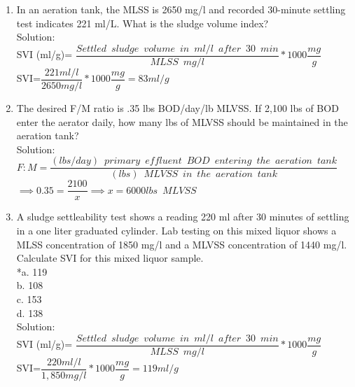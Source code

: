 \begin{enumerate}
\item In an aeration tank, the MLSS is 2650 mg/l and recorded 30-minute settling test indicates 221 ml/L.  What is the sludge volume index?\\
\vspace{0.3cm}
Solution:\\
SVI (ml/g)= $\dfrac{Settled \enspace sludge \enspace volume \enspace in \enspace ml/l \enspace after \enspace 30 \enspace min}{MLSS \enspace mg/l}*1000 \dfrac{mg}{g}$\\
\vspace{0.25cm}
SVI=$\dfrac{221ml/l}{2650mg/l}*1000\dfrac{mg}{g}=\boxed{83ml/g}$
\item The desired F/M ratio is .35 lbs BOD/day/lb MLVSS. If 2,100 lbs of BOD enter the aerator daily, how many lbs of MLVSS should be maintained in the aeration tank?\\
Solution:\\
$F:M=\dfrac{(lbs/day) \enspace primary \enspace effluent  \enspace BOD \enspace entering \enspace the  \enspace aeration \enspace tank}{(lbs) \enspace MLVSS \enspace in \enspace the  \enspace aeration \enspace tank}$\\
\vspace{0.3cm}
$\implies 0.35=\dfrac{2100}{x}\implies x = \boxed{6000lbs \enspace MLVSS}$\\

\item A sludge settleability test shows a reading 220 ml after 30 minutes of settling in a one liter graduated cylinder. Lab testing on this mixed liquor shows a MLSS concentration of 1850 mg/l and a MLVSS concentration of 1440 mg/l. Calculate SVI for this mixed liquor sample.\\

\vspace{0.25cm}
*a. 119 \\
b. 108 \\
c. 153 \\
d. 138 \\

\vspace{0.25cm}
Solution:\\
SVI (ml/g)= $\dfrac{Settled \enspace sludge \enspace volume \enspace in \enspace ml/l \enspace after \enspace 30 \enspace min}{MLSS \enspace mg/l}*1000 \dfrac{mg}{g}$\\
\vspace{0.25cm}
SVI=$\dfrac{220ml/l}{1,850mg/l}*1000\dfrac{mg}{g}=\boxed{119ml/g}$


\end{enumerate}
